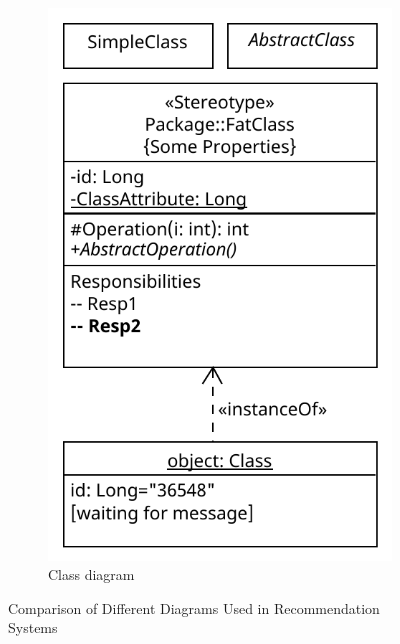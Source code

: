 \documentclass[10pt,twocolumn,twoside,slovak,a4paper]{article}
\begin{document}
\begin{figure}[htbp]
\begin{subfigure}[b]{0.45\textwidth}
        \includegraphics[width=\textwidth]{Diagrams/Diagram 2024-10-24 01-38-35.pdf}
        \caption{Class diagram}
        \label{fig:content_based_filtering}
    \end{subfigure}
    \caption{Comparison of Different Diagrams Used in Recommendation Systems}
    \label{fig:recommendation_systems}
\end{figure}
\end{document}
